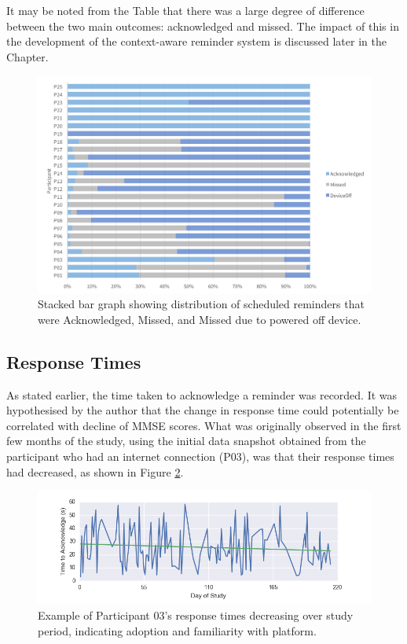 It may be noted from the Table that there was a large degree of difference between the two main outcomes: acknowledged and missed. The impact of this in the development of the context-aware reminder system is discussed later in the Chapter.

\begin{figure}[h]
    \centering
        \includegraphics[scale=0.6, angle=0]{Files/treatment-study-1/figures/reminder-stacked-stats}
        \caption{Stacked bar graph showing distribution of scheduled reminders that were Acknowledged, Missed, and Missed due to powered off device.}
        \label{fig: reminder-stacked-stats}
\end{figure}

\subsection{Response Times}
As stated earlier, the time taken to acknowledge a reminder was recorded. It was hypothesised by the author that the change in response time could potentially be correlated with decline of MMSE scores. What was originally observed in the first few months of the study, using the initial data snapshot obtained from the participant who had an internet connection (P03), was that their response times had decreased, as shown in Figure \ref{fig: responsetimedecrease}.

\begin{figure}[h]
    \centering
        \includegraphics[scale=0.7, angle=0]{Files/treatment-study-1/figures/responsetimedecrease}
        \caption{Example of Participant 03's response times decreasing over study period, indicating adoption and familiarity with platform.}
        \label{fig: responsetimedecrease}
\end{figure}

